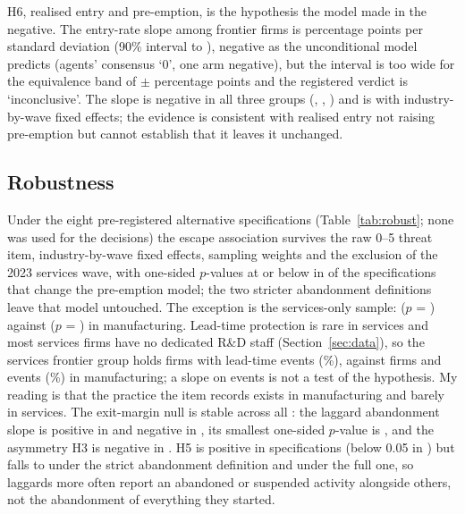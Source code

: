 \documentclass[preprint,12pt,authoryear]{elsarticle}
\begin{document}
H6, realised entry and pre-emption, is the hypothesis the model made in the negative. The entry-rate slope among frontier firms is \KISHSixPp{} percentage points per standard deviation (90\% interval \KISHSixNinetyLoPp{} to \KISHSixNinetyHiPp), negative as the unconditional model predicts (agents' consensus `0', one arm negative), but the interval is too wide for the equivalence band of $\pm$\KISHSixDeltaPp{} percentage points and the registered verdict is `inconclusive'. The slope is negative in all three groups (\CoefPreObjXGZero, \CoefPreObjXGOne, \CoefPreObjXGTwo) and is \RobFEIWHSixEst{} with industry-by-wave fixed effects; the evidence is consistent with realised entry not raising pre-emption but cannot establish that it leaves it unchanged.

\subsection{Robustness}

Under the eight pre-registered alternative specifications (Table~\ref{tab:robust}; none was used for the decisions) the escape association survives the raw 0--5 threat item, industry-by-wave fixed effects, sampling weights and the exclusion of the 2023 services wave, with one-sided $p$-values at or below \RobHOneDistinctMaxSigP{} in \RobHOneDistinctSigCount{} of the \RobHOneDistinctSpecCount{} specifications that change the pre-emption model; the two stricter abandonment definitions leave that model untouched. The exception is the services-only sample: \RobServHOneEst{} ($p$ = \RobServHOneP) against \RobManuHOneEst{} ($p$ = \RobManuHOneP) in manufacturing. Lead-time protection is rare in services and most services firms have no dedicated R\&D staff (Section~\ref{sec:data}), so the services frontier group holds \SecGapNServTwo{} firms with \SecGapPreEventsServTwo{} lead-time events (\SecGapPreRateServTwoPct\%), against \SecGapNManuTwo{} firms and \SecGapPreEventsManuTwo{} events (\SecGapPreRateManuTwoPct\%) in manufacturing; a slope on \SecGapPreEventsServTwo{} events is not a test of the hypothesis. My reading is that the practice the item records exists in manufacturing and barely in services. The exit-margin null is stable across all \RobSpecCount: the laggard abandonment slope is positive in \RobHTwoPosCount{} and negative in \RobHTwoNegCount, its smallest one-sided $p$-value is \RobHTwoMinP, and the asymmetry H3 is negative in \RobHThreeNegCount. H5 is positive in \RobHFivePosCount{} specifications (below 0.05 in \RobHFiveSigCount) but falls to \RobStrictHFiveEst{} under the strict abandonment definition and \RobFullHFiveEst{} under the full one, so laggards more often report an abandoned or suspended activity alongside others, not the abandonment of everything they started.
\end{document}
